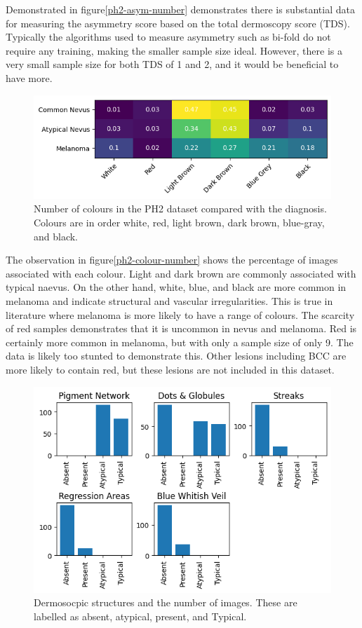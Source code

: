 Demonstrated in figure\ref{ph2-asym-number} demonstrates there is substantial data for measuring the asymmetry score based on the total dermoscopy score (TDS). Typically the algorithms used to measure asymmetry such as bi-fold do not require any training, making the smaller sample size ideal. However, there is a very small sample size for both TDS of 1 and 2, and it would be beneficial to have more.

\begin{figure}
	\centering
	\includegraphics[scale=0.75]{images/ph2/ph2-colour-number-heat.png}
	\caption{Number of colours in the PH2 dataset compared with the diagnosis. Colours are in order white, red, light brown, dark brown, blue-gray, and black.}
\end{figure}\label{ph2-colour-number}

The observation in figure\ref{ph2-colour-number} shows the percentage of images associated with each colour. Light and dark brown are commonly associated with typical naevus. On the other hand, white, blue, and black are more common in melanoma and indicate structural and vascular irregularities. This is true in literature where melanoma is more likely to have a range of colours. The scarcity of red samples demonstrates that it is uncommon in nevus and melanoma. Red is certainly more common in melanoma, but with only a sample size of only 9. The data is likely too stunted to demonstrate this. Other lesions including BCC are more likely to contain red\cite{}, but these lesions are not included in this dataset.

\begin{figure}
	\centering
	\includegraphics[scale=0.75]{images/ph2/ph2-dermo-number.png}
	\caption{Dermosocpic structures and the number of images. These are labelled as absent, atypical, present, and Typical.}
\end{figure}\label{ph2-dermo-number}

